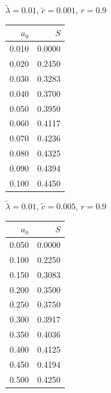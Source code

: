 \documentclass[11pt,a4paper]{article}
\begin{document}
\begin{minipage}[t]{\textwidth}
    \begin{minipage}[t]{0.32\textwidth}
        \footnotesize
        \begin{flushleft}$\tilde{\lambda}=0.01$, $\tilde{c}=0.001$, $r=0.9$\end{flushleft}
        \begin{tabular}[t]{rr}
            $a_0$ & $S$ \\
            \hline
             0.010 & 0.0000 \\
             0.020 & 0.2450 \\
             0.030 & 0.3283 \\
             0.040 & 0.3700 \\
             0.050 & 0.3950 \\
             0.060 & 0.4117 \\
             0.070 & 0.4236 \\
             0.080 & 0.4325 \\
             0.090 & 0.4394 \\
             0.100 & 0.4450 \\
        \end{tabular}
    \end{minipage}
    \begin{minipage}[t]{0.32\textwidth}
        \footnotesize
        \begin{flushleft}$\tilde{\lambda}=0.01$, $\tilde{c}=0.005$, $r=0.9$\end{flushleft}
        \begin{tabular}[t]{rr}
            $a_0$ & $S$ \\
            \hline
             0.050 & 0.0000 \\
             0.100 & 0.2250 \\
             0.150 & 0.3083 \\
             0.200 & 0.3500 \\
             0.250 & 0.3750 \\
             0.300 & 0.3917 \\
             0.350 & 0.4036 \\
             0.400 & 0.4125 \\
             0.450 & 0.4194 \\
             0.500 & 0.4250 \\
        \end{tabular}
    \end{minipage}
    \begin{minipage}[t]{0.32\textwidth}

\end{minipage}
\end{minipage}
\end{document}

